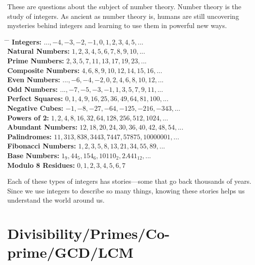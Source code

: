 \documentclass[10pt,a4paper]{article}
\begin{document}
These are questions about the subject of number theory. Number theory is the study of integers. As ancient as number theory is, humans are still uncovering mysteries behind integers and learning to use them in powerful new ways.

\begin{tabbing}
\hspace{4cm} \= \hspace{3cm} \= \kill
\textbf{Integers:} \> $..., -4, -3, -2, -1, 0, 1, 2, 3, 4, 5, ...$ \\
\textbf{Natural Numbers:} \> $1, 2, 3, 4, 5, 6, 7, 8, 9, 10, ...$ \\
\textbf{Prime Numbers:} \> $2, 3, 5, 7, 11, 13, 17, 19, 23, ...$ \\
\textbf{Composite Numbers:} \> $4, 6, 8, 9, 10, 12, 14, 15, 16, ...$ \\
\textbf{Even Numbers:} \> $..., -6, -4, -2, 0, 2, 4, 6, 8, 10, 12, ...$ \\
\textbf{Odd Numbers:} \> $..., -7, -5, -3, -1, 1, 3, 5, 7, 9, 11, ...$ \\
\textbf{Perfect Squares:} \> $0, 1, 4, 9, 16, 25, 36, 49, 64, 81, 100, ...$ \\
\textbf{Negative Cubes:} \> $-1, -8, -27, -64, -125, -216, -343, ...$ \\
\textbf{Powers of 2:} \> $1, 2, 4, 8, 16, 32, 64, 128, 256, 512, 1024, ...$ \\
\textbf{Abundant Numbers:} \> $12, 18, 20, 24, 30, 36, 40, 42, 48, 54, ...$ \\
\textbf{Palindromes:} \> $11, 313, 838, 3443, 7447, 57875, 10000001, ...$ \\
\textbf{Fibonacci Numbers:} \> $1, 2, 3, 5, 8, 13, 21, 34, 55, 89, ...$ \\
\textbf{Base Numbers:} \> $1_9, 44_5, 154_6, 10110_2, 2A41_{12}, ...$ \\
\textbf{Modulo 8 Residues:} \> $0, 1, 2, 3, 4, 5, 6, 7$ \\
\end{tabbing}

Each of these types of integers has stories—some that go back thousands of years. Since we use integers to describe so many things, knowing these stories helps us understand the world around us.


\section*{Divisibility/Primes/Co-prime/GCD/LCM}
\end{document}
